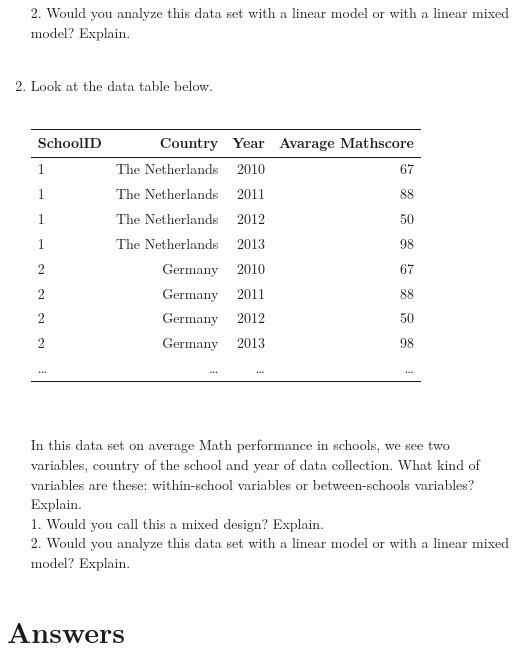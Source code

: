 \documentclass[]{book}\usepackage[]{graphicx}\usepackage[]{color}
\begin{document}
\begin{enumerate}
2. Would you analyze this data set with a linear model or with a linear mixed model? Explain.\\
\\
\item Look at the data table below.
\\
 \\
 \begin{tabular}{lrrr}
  SchoolID & Country & Year & Avarage Mathscore  \\ \hline
 1   & The Netherlands      &  2010 & 67   \\
 1   &  The Netherlands     &  2011 & 88   \\
 1    & The Netherlands         &  2012 & 50   \\
 1   &  The Netherlands        &  2013 & 98  \\
 2   & Germany      &  2010 & 67   \\
 2   &  Germany     &  2011 & 88   \\
 2    & Germany         &  2012 & 50   \\
 2   &  Germany        &  2013 & 98  \\
  \dots   & \dots        &  \dots & \dots  \\
 \end{tabular}
\\
\\
In this data set on average Math performance in schools, we see two variables, country of the school and year of data collection. What kind of variables are these: within-school variables or between-schools variables? Explain.\\
1. Would you call this a mixed design? Explain.\\
2. Would you analyze this data set with a linear model or with a linear mixed model? Explain.\\

\end{enumerate}


\section{Answers}
\end{document}
